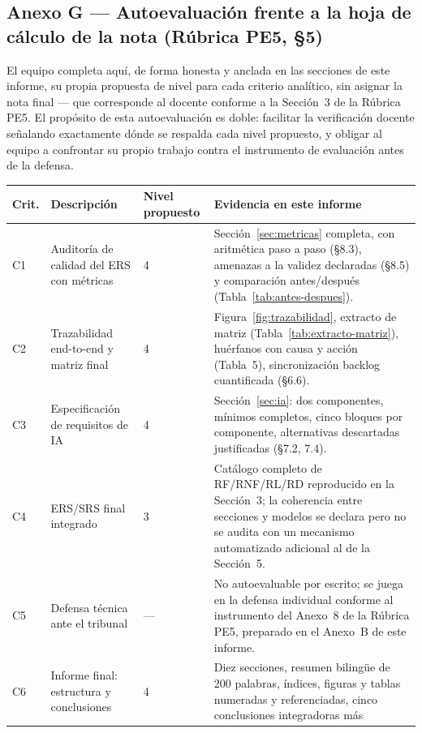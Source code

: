 \documentclass[11pt,a4paper]{article}
\begin{document}
\subsection*{Anexo G --- Autoevaluación frente a la hoja de cálculo de la nota (Rúbrica PE5, \S 5)}

El equipo completa aquí, de forma honesta y anclada en las secciones de este informe, su propia
propuesta de nivel para cada criterio analítico, sin asignar la nota final --- que corresponde al
docente conforme a la Sección~3 de la Rúbrica PE5. El propósito de esta autoevaluación es doble:
facilitar la verificación docente señalando exactamente dónde se respalda cada nivel propuesto, y
obligar al equipo a confrontar su propio trabajo contra el instrumento de evaluación antes de la
defensa.

\begin{longtable}{|C{1.0cm}|L{3.6cm}|C{1.3cm}|L{6.6cm}|}
\hline
{}\textbf{Crit.} & \textbf{Descripción} & \textbf{Nivel propuesto} & \textbf{Evidencia en este informe} \\
\hline
\endhead
C1 & Auditoría de calidad del ERS con métricas & 4 & Sección~\ref{sec:metricas} completa, con
aritmética paso a paso (\S 8.3), amenazas a la validez declaradas (\S 8.5) y comparación
antes/después (Tabla~\ref{tab:antes-despues}). \\ \hline
C2 & Trazabilidad end-to-end y matriz final & 4 & Figura~\ref{fig:trazabilidad}, extracto de matriz
(Tabla~\ref{tab:extracto-matriz}), huérfanos con causa y acción (Tabla~5), sincronización backlog
cuantificada (\S 6.6). \\ \hline
C3 & Especificación de requisitos de IA & 4 & Sección~\ref{sec:ia}: dos componentes, mínimos
completos, cinco bloques por componente, alternativas descartadas justificadas (\S 7.2, 7.4). \\
\hline
C4 & ERS/SRS final integrado & 3 & Catálogo completo de RF/RNF/RL/RD reproducido en la
Sección~3; la coherencia entre secciones y modelos se declara pero no se audita con un mecanismo
automatizado adicional al de la Sección~5. \\ \hline
C5 & Defensa técnica ante el tribunal & --- & No autoevaluable por escrito; se juega en la
defensa individual conforme al instrumento del Anexo~8 de la Rúbrica PE5, preparado en el
Anexo~B de este informe. \\ \hline
C6 & Informe final: estructura y conclusiones & 4 & Diez secciones, resumen bilingüe de 200
palabras, índices, figuras y tablas numeradas y referenciadas, cinco conclusiones integradoras más

\end{longtable}
\end{document}
